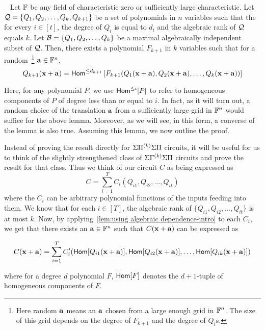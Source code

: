 \begin{lemma}~\label{lem:using algebraic dependence-intro}
Let $\mathbb{F}$ be any  field of characteristic zero or sufficiently large characteristic. Let ${\cal Q} = \{Q_1, Q_2, \ldots, Q_k, Q_{k+1}\}$ be a set of polynomials in $n$ variables such that the for every $i \in [t]$, the degree of  $Q_i$ is equal to $d_i$ and  the algebraic rank of ${\cal Q}$ equals $k$. Let  ${\cal B} = \{Q_1, Q_2, \ldots, Q_k\}$ be a maximal algebraically independent subset of ${\cal Q}$. Then, there exists a polynomial $F_{k+1}$  in $k$ variables such that for a random~\footnote{Here random $\mathbf{a}$ means an $\mathbf{a}$ chosen from a large enough grid in $\mathbb{F}^n$. The size of this grid depends on the degree of $F_{k+1}$ and the degree of $Q_i$s. } $\mathbf{a} \in \mathbb{F}^{n}$,  
$$Q_{k+1}(\mathbf{x} + \mathbf{a}) = \mathsf{Hom}^{\leq d_{k+1}}\left[F_{k+1}(Q_1(\mathbf{x} + \mathbf{a}), Q_2(\mathbf{x} + \mathbf{a}), \ldots, Q_k(\mathbf{x} + \mathbf{a})) \right] $$
\end{lemma}
Here, for any  polynomial $P$, we use $\mathsf{Hom}^{\leq i}[P]$ to refer to homogeneous components of $P$ of degree less than or equal to $i$. In fact, as it will turn out, a random choice of the translation $\mathbf{a}$ from a sufficiently large grid in $\mathbb{F}^n$ would suffice for the above lemma. 
Moreover, as we will see, in this form, a converse of the lemma is also true. Assuming this lemma, we now outline the proof. 

Instead of proving the result directly for $\Sigma{\Pi^{(k)}}\Sigma\Pi$ circuits, it will be  useful for us to think of  the slightly strengthened class of $\Sigma{\Gamma^{(k)}}\Sigma\Pi$ circuits and prove the result for that class. Thus we think of our circuit $C$ as being expressed as
$$C = \sum_{i = 1}^T  C_{i}(Q_{i1}, Q_{i2}, \ldots, Q_{it})$$  where the $C_i$ can be arbitrary polynomial functions of the inputs feeding into them. We know that for each $i \in [T]$, the algebraic rank of $\{Q_{i1}, Q_{i2}, \ldots, Q_{it}\}$ is at most $k$. Now, by applying~\autoref{lem:using algebraic dependence-intro} to each $C_i$, we get that there exists an $\mathbf{a} \in \mathbb{F}^{n}$ such that $C(\mathbf{x}+\mathbf{a})$ can be expressed as  


\begin{multline}
C(\mathbf{x} + \mathbf{a}) = \sum_{i = 1}^T  C_i'(\mathsf{Hom}[Q_{i1}(\mathbf{x} + \mathbf{a})], \mathsf{Hom}[Q_{i2}(\mathbf{x} + \mathbf{a})], \ldots, \mathsf{Hom}[Q_{ik}(\mathbf{x} + \mathbf{a})])
\end{multline}

where for a degree $d$ polynomial $F$, $\mathsf{Hom}[F]$ denotes the $d+1$-tuple of homogeneous components of $F$. 

